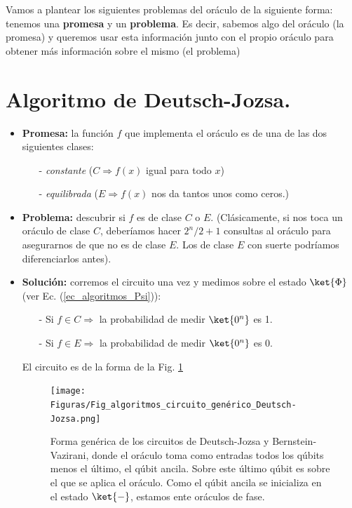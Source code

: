\documentclass[a4paper,11pt]{book} %
\numberwithin{equation}{chapter}
\begin{document}
Vamos a plantear los siguientes problemas del oráculo de la siguiente forma: tenemos una \textbf{promesa} y un \textbf{problema}. Es decir, sabemos algo del oráculo (la promesa) y queremos usar esta información junto con el propio oráculo para obtener más información sobre el mismo (el problema)


	\section{Algoritmo de Deutsch-Jozsa.}

\begin{itemize}
	\item \textbf{Promesa:} la función $f$ que implementa el oráculo es de una de las dos siguientes clases: 
	\begin{itemize}
		\item[-] \textit{constante} ($C \Rightarrow f(x)$ igual para todo $x$)
		\item[-] \textit{equilibrada} ($E \Rightarrow f(x)$ nos da tantos unos como ceros.)
	\end{itemize}		
	
	\item \textbf{Problema:} descubrir si $f$ es de clase $C$ o $E$. (Clásicamente, si nos toca un oráculo de clase $C$, deberíamos hacer $2^n/2+1$ consultas al oráculo para asegurarnos de que no es de clase $E$. Los de clase $E$ con suerte podríamos diferenciarlos antes).
	
	\item \textbf{Solución:} corremos el circuito una vez y medimos sobre el estado $\ket{\Phi}$ (ver Ec. (\ref{ec_algoritmos_Psi})):
	\begin{itemize}
		\item[-] Si $f \in C \Rightarrow$ la probabilidad de medir $\ket{0^n}$ es 1.
		\item[-] Si $f \in E \Rightarrow$ la probabilidad de medir $\ket{0^n}$ es 0.
	\end{itemize}
	El circuito es de la forma de la Fig. \ref{Fig_algoritmos_circuito_genérico_Deutsch-Jozsa}
		\begin{figure}[h!]
		\centering 
		\texttt{[image: Figuras/Fig\_algoritmos\_circuito\_genérico\_Deutsch-Jozsa.png]}
		\caption{Forma genérica de los circuitos de Deutsch-Jozsa y Bernstein-Vazirani, donde el oráculo toma como entradas todos los qúbits menos el último, el qúbit ancila. Sobre este último qúbit es sobre el que se aplica el oráculo. Como el qúbit ancila se inicializa en el estado $\ket{-}$, estamos ente oráculos de fase.}
		\label{Fig_algoritmos_circuito_genérico_Deutsch-Jozsa}
		\end{figure}

\end{itemize}
\end{document}
